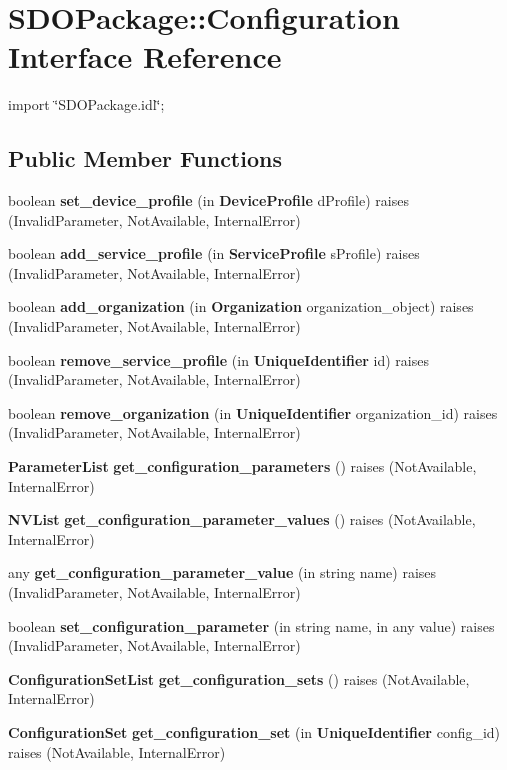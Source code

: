 \section{SDOPackage::Configuration Interface Reference}
\label{interfaceSDOPackage_1_1Configuration}


{\ttfamily import \char`\"{}SDOPackage.idl\char`\"{};}

\subsection*{Public Member Functions}
\begin{DoxyCompactItemize}
\item 
boolean {\bf set\_\-device\_\-profile} (in {\bf DeviceProfile} dProfile)  raises (InvalidParameter, NotAvailable, InternalError)
\item 
boolean {\bf add\_\-service\_\-profile} (in {\bf ServiceProfile} sProfile)  raises (InvalidParameter, NotAvailable, InternalError)
\item 
boolean {\bf add\_\-organization} (in {\bf Organization} organization\_\-object)  raises (InvalidParameter, NotAvailable, InternalError)
\item 
boolean {\bf remove\_\-service\_\-profile} (in {\bf UniqueIdentifier} id)  raises (InvalidParameter, NotAvailable, InternalError)
\item 
boolean {\bf remove\_\-organization} (in {\bf UniqueIdentifier} organization\_\-id)  raises (InvalidParameter, NotAvailable, InternalError)
\item 
{\bf ParameterList} {\bf get\_\-configuration\_\-parameters} ()  raises (NotAvailable, InternalError)
\item 
{\bf NVList} {\bf get\_\-configuration\_\-parameter\_\-values} ()  raises (NotAvailable, InternalError)
\item 
any {\bf get\_\-configuration\_\-parameter\_\-value} (in string name)  raises (InvalidParameter, NotAvailable, InternalError)
\item 
boolean {\bf set\_\-configuration\_\-parameter} (in string name, in any value)  raises (InvalidParameter, NotAvailable, InternalError)
\item 
{\bf ConfigurationSetList} {\bf get\_\-configuration\_\-sets} ()  raises (NotAvailable, InternalError)
\item 
{\bf ConfigurationSet} {\bf get\_\-configuration\_\-set} (in {\bf UniqueIdentifier} config\_\-id)  raises (NotAvailable, InternalError)

\end{DoxyCompactItemize}
